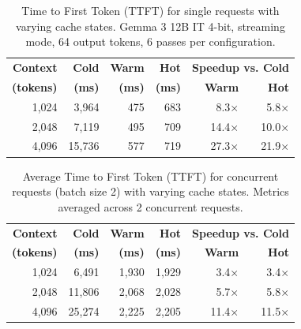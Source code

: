 

\begin{table}[t]
\centering
\caption{Time to First Token (TTFT) for single requests with varying cache states.
Gemma 3 12B IT 4-bit, streaming mode, 64 output tokens, 6 passes per configuration.}
\label{tab:ttft-single}
\begin{tabular}{rrrrrr}
\toprule
\textbf{Context} & \textbf{Cold} & \textbf{Warm} & \textbf{Hot} & \multicolumn{2}{c}{\textbf{Speedup vs. Cold}} \\
\textbf{(tokens)} & \textbf{(ms)} & \textbf{(ms)} & \textbf{(ms)} & \textbf{Warm} & \textbf{Hot} \\
\midrule
1,024  & 3,964 & 475   & 683   & 8.3×   & 5.8×  \\
2,048  & 7,119 & 495   & 709   & 14.4×  & 10.0× \\
4,096  & 15,736 & 577  & 719   & 27.3×  & 21.9× \\
\bottomrule
\end{tabular}
\end{table}


\begin{table}[t]
\centering
\caption{Average Time to First Token (TTFT) for concurrent requests (batch size 2) with varying cache states.
Metrics averaged across 2 concurrent requests.}
\label{tab:ttft-concurrent}
\begin{tabular}{rrrrrr}
\toprule
\textbf{Context} & \textbf{Cold} & \textbf{Warm} & \textbf{Hot} & \multicolumn{2}{c}{\textbf{Speedup vs. Cold}} \\
\textbf{(tokens)} & \textbf{(ms)} & \textbf{(ms)} & \textbf{(ms)} & \textbf{Warm} & \textbf{Hot} \\
\midrule
1,024  & 6,491  & 1,930 & 1,929 & 3.4×   & 3.4×  \\
2,048  & 11,806 & 2,068 & 2,028 & 5.7×   & 5.8×  \\
4,096  & 25,274 & 2,225 & 2,205 & 11.4×  & 11.5× \\
\bottomrule
\end{tabular}
\end{table}

